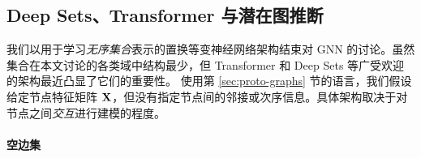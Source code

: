 %
%
 

\subsection{Deep Sets、Transformer 与潜在图推断}
\label{sec:deepset}

我们以用于学习\emph{无序集合}表示的置换等变神经网络架构结束对 GNN 的讨论。虽然集合在本文讨论的各类域中结构最少，但 Transformer \citep{vaswani2017attention} 和 Deep Sets \citep{zaheer2017deep} 等广受欢迎的架构最近凸显了它们的重要性。
%
%
使用第 \ref{sec:proto-graphs} 节的语言，我们假设给定节点特征矩阵 ${\bf X}$，但没有指定节点间的邻接或次序信息。具体架构取决于对节点之间\emph{交互}进行建模的程度。
 
\paragraph*{空边集}

